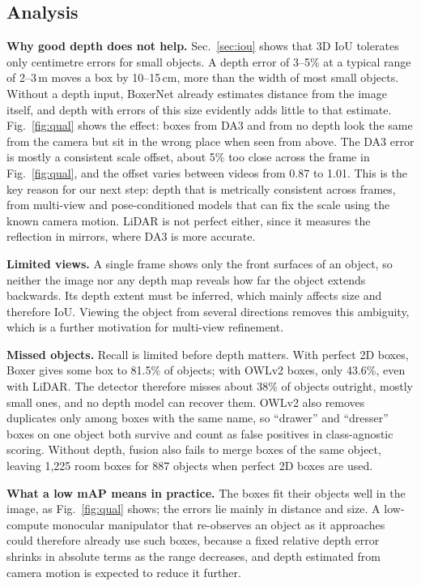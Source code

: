 \documentclass[conference]{IEEEtran}
\begin{document}
\subsection{Analysis}
\label{sec:analysis}
\textbf{Why good depth does not help.} Sec.~\ref{sec:iou} shows that 3D IoU tolerates only centimetre errors for small objects. A depth error of 3--5\% at a typical range of 2--3\,m moves a box by 10--15\,cm, more than the width of most small objects. Without a depth input, BoxerNet already estimates distance from the image itself, and depth with errors of this size evidently adds little to that estimate. Fig.~\ref{fig:qual} shows the effect: boxes from DA3 and from no depth look the same from the camera but sit in the wrong place when seen from above. The DA3 error is mostly a consistent scale offset, about 5\% too close across the frame in Fig.~\ref{fig:qual}, and the offset varies between videos from 0.87 to 1.01. This is the key reason for our next step: depth that is metrically consistent across frames, from multi-view and pose-conditioned models that can fix the scale using the known camera motion. LiDAR is not perfect either, since it measures the reflection in mirrors, where DA3 is more accurate.

\textbf{Limited views.} A single frame shows only the front surfaces of an object, so neither the image nor any depth map reveals how far the object extends backwards. Its depth extent must be inferred, which mainly affects size and therefore IoU. Viewing the object from several directions removes this ambiguity, which is a further motivation for multi-view refinement.

\textbf{Missed objects.} Recall is limited before depth matters. With perfect 2D boxes, Boxer gives some box to 81.5\% of objects; with OWLv2 boxes, only 43.6\%, even with LiDAR. The detector therefore misses about 38\% of objects outright, mostly small ones, and no depth model can recover them. OWLv2 also removes duplicates only among boxes with the same name, so ``drawer'' and ``dresser'' boxes on one object both survive and count as false positives in class-agnostic scoring. Without depth, fusion also fails to merge boxes of the same object, leaving 1{,}225 room boxes for 887 objects when perfect 2D boxes are used.

\textbf{What a low mAP means in practice.} The boxes fit their objects well in the image, as Fig.~\ref{fig:qual} shows; the errors lie mainly in distance and size. A low-compute monocular manipulator that re-observes an object as it approaches could therefore already use such boxes, because a fixed relative depth error shrinks in absolute terms as the range decreases, and depth estimated from camera motion is expected to reduce it further.
\end{document}
